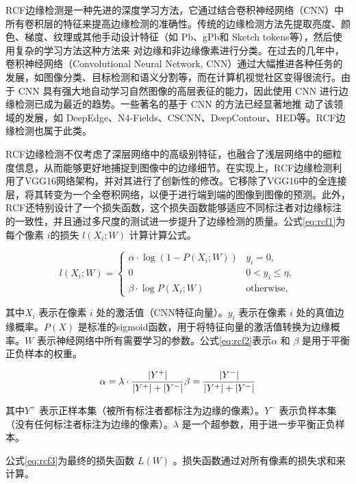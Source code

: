 RCF边缘检测是一种先进的深度学习方法，它通过结合卷积神经网络（CNN）中所有卷积层的特征来提高边缘检测的准确性。传统的边缘检测方法先提取亮度、颜色、梯度、纹理或其他手动设计特征（如 Pb、gPb和 Sketch tokens等），然后使用复杂的学习方法这种方法来 对边缘和非边缘像素进行分类。在过去的几年中，卷积神经网络（Convolutional Neural Network, CNN）通过大幅推进各种任务的发展，如图像分类、目标检测和语义分割等，而在计算机视觉社区变得很流行。由于 CNN 具有强大地自动学习自然图像的高层表征的能力，因此使用 CNN 进行边缘检测已成为最近的趋势。一些著名的基于 CNN 的方法已经显著地推 动了该领域的发展，如 DeepEdge、N4-Fields、CSCNN、DeepContour、HED等。RCF边缘检测也属于此类。\cite{8100105}

RCF边缘检测不仅考虑了深层网络中的高级别特征，也融合了浅层网络中的细粒度信息，从而能够更好地捕捉到图像中的边缘细节。在实现上，RCF边缘检测利用了VGG16网络架构，并对其进行了创新性的修改。它移除了VGG16中的全连接层，将其转变为一个全卷积网络，以便于进行端到端的图像到图像的预测。此外，RCF还特别设计了一个损失函数，这个损失函数能够适应不同标注者对边缘标注的一致性，并且通过多尺度的测试进一步提升了边缘检测的质量。公式\eqref{eq:rcf1}为每个像素 \( i \)的损失 \( l(X_i; W) \) 计算计算公式。

\begin{equation}
l(X_i; W) = \begin{cases}
\alpha \cdot \log (1 - P(X_i; W)) & y_i = 0, \\
0 & 0 < y_i \leq \eta, \\
\beta \cdot \log P(X_i; W) & \text{otherwise},
\end{cases}
  \label{eq:rcf1}
\end{equation}

其中\( X_i \) 表示在像素 \( i \) 处的激活值（CNN特征向量）。\( y_i \) 表示在像素 \( i \) 处的真值边缘概率。\( P(X) \) 是标准的sigmoid函数，用于将特征向量的激活值转换为边缘概率。\( W \) 表示神经网络中所有需要学习的参数。公式\eqref{eq:rcf2}表示\( \alpha \) 和 \( \beta \) 是用于平衡正负样本的权重。

\begin{equation}
  \alpha = \lambda \cdot \frac{|Y^+|}{|Y^+| + |Y^-|} \\
  \beta = \frac{|Y^-|}{|Y^+| + |Y^-|}
  \label{eq:rcf2}
\end{equation}

其中\( Y^+ \) 表示正样本集（被所有标注者都标注为边缘的像素）。\( Y^- \) 表示负样本集（没有任何标注者标注为边缘的像素）。\( \lambda \) 是一个超参数，用于进一步平衡正负样本。

公式\eqref{eq:rcf3}为最终的损失函数 \( L(W) \) 。损失函数通过对所有像素的损失求和来计算。

